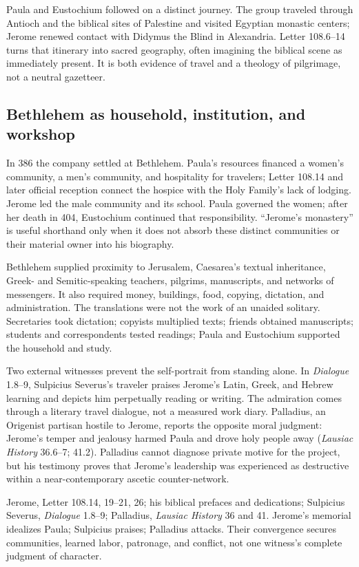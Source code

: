 Paula and Eustochium followed on a distinct journey. The group traveled through
Antioch and the biblical sites of Palestine and visited Egyptian monastic
centers; Jerome renewed contact with Didymus the Blind in Alexandria. Letter
108.6--14 turns that itinerary into sacred geography, often imagining the
biblical scene as immediately present. It is both evidence of travel and a
theology of pilgrimage, not a neutral gazetteer.

\subsection{Bethlehem as household, institution, and workshop}

In 386 the company settled at Bethlehem. Paula's resources financed a women's
community, a men's community, and hospitality for travelers; Letter 108.14 and
later official reception connect the hospice with the Holy Family's lack of
lodging. Jerome led the male community and its school. Paula governed the women;
after her death in 404, Eustochium continued that responsibility. ``Jerome's
monastery'' is useful shorthand only when it does not absorb these distinct
communities or their material owner into his biography.

Bethlehem supplied proximity to Jerusalem, Caesarea's textual inheritance,
Greek- and Semitic-speaking teachers, pilgrims, manuscripts, and networks of
messengers. It also required money, buildings, food, copying, dictation, and
administration. The translations were not the work of an unaided solitary.
Secretaries took dictation; copyists multiplied texts; friends obtained manuscripts;
students and correspondents tested readings; Paula and Eustochium supported the
household and study.

Two external witnesses prevent the self-portrait from standing alone. In
\emph{Dialogue} 1.8--9, Sulpicius Severus's traveler praises Jerome's Latin,
Greek, and Hebrew learning and depicts him perpetually reading or writing. The
admiration comes through a literary travel dialogue, not a measured work diary.
Palladius, an Origenist partisan hostile to Jerome, reports the opposite moral
judgment: Jerome's temper and jealousy harmed Paula and drove holy people away
(\emph{Lausiac History} 36.6--7; 41.2). Palladius cannot diagnose private
motive for the project, but his testimony proves that Jerome's leadership was
experienced as destructive within a near-contemporary ascetic counter-network.

{Jerome, Letter 108.14, 19--21, 26; his biblical prefaces and dedications;
Sulpicius Severus, \emph{Dialogue} 1.8--9; Palladius, \emph{Lausiac History}
36 and 41.}
{Jerome's memorial idealizes Paula; Sulpicius praises; Palladius attacks. Their
convergence secures communities, learned labor, patronage, and conflict, not
one witness's complete judgment of character.}
